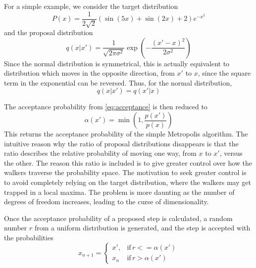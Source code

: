 \documentclass[twocolumn]{article}
\begin{document}
For a simple example, we consider the target distribution
\begin{equation}
	P(x) = \frac{1}{2 \sqrt{2}} \left( \sin(5x) + \sin(2x) + 2 \right) e^{-x^2}
	\label{eq:example}
\end{equation}
and the proposal distribution
\begin{equation}
	q(x | x') = \frac{1}{\sqrt{2 \pi \sigma^2}} \exp \left( - \frac{(x' - x)^2}{2 \sigma^2} \right)
\end{equation}
Since the normal distribution is symmetrical, this is actually equivalent to
distribution which moves in the opposite direction, from $x'$ to $x$, since the
square term in the exponential can be reversed. Thus, for the normal
distribution,
\begin{equation}
	q(x | x') = q(x' | x)
\end{equation}

The acceptance probability from \ref{eq:acceptance} is then reduced to
\begin{equation}
	\alpha(x') = \min \left( 1, \frac{p(x')}{p(x)} \right)
\end{equation}
This returns the acceptance probability of the simple Metropolis algorithm. The
intuitive reason why the ratio of proposal distributions disappears is that the
ratio describes the relative probability of moving one way, from $x$ to $x'$,
versus the other. The reason this ratio is included is to give greater control
over how the walkers traverse the probability space. The motivation to seek
greater control is to avoid completely relying on the target distribution, where
the walkers may get trapped in a local maxima. The problem is more daunting as
the number of degrees of freedom increases, leading to the curse of
dimensionality.

Once the acceptance probability of a proposed step is calculated, a random
number $r$ from a uniform distribution is generated, and the step is accepted
with the probabilities
\begin{equation}
	x_{n+1} = \left\{
	\begin{array}{lr}
		x', & \text{if} \, r <= \alpha(x') \\
		x_n & \text{if} \, r > \alpha(x')
	\end{array}
	\right.
\end{equation}
\end{document}

